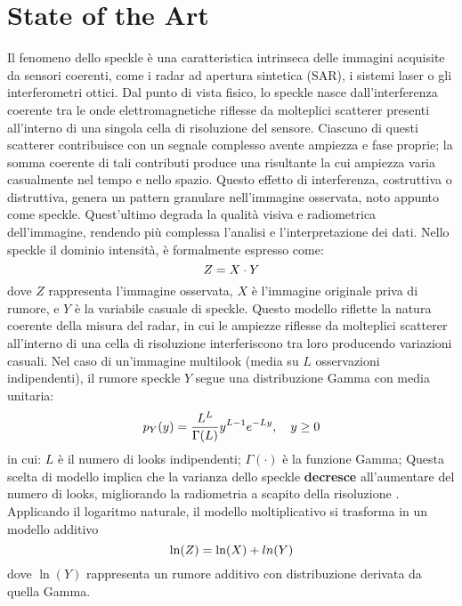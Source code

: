 
\chapter{State of the Art}
Il fenomeno dello speckle è una caratteristica intrinseca delle immagini acquisite da sensori coerenti, 
come i radar ad apertura sintetica (SAR), i sistemi laser o gli interferometri ottici. 
Dal punto di vista fisico, lo speckle nasce dall’interferenza coerente tra le onde elettromagnetiche riflesse 
da molteplici scatterer presenti all’interno di una singola cella di risoluzione del sensore. 
Ciascuno di questi scatterer contribuisce con un segnale complesso avente ampiezza e fase proprie; 
la somma coerente di tali contributi produce una risultante la cui ampiezza varia casualmente nel tempo e nello spazio.  
Questo effetto di interferenza, costruttiva o distruttiva, genera un pattern granulare nell’immagine osservata, 
noto appunto come speckle. Quest'ultimo degrada la qualità visiva e radiometrica dell’immagine, rendendo più complessa l’analisi e l’interpretazione dei dati.
Nello speckle il dominio intensità, è formalmente espresso come:
\[
    \makebox[\textwidth][c]{%
      $\displaystyle
      Z = X \cdot Y
      $%
    }
\]
dove $Z$ rappresenta l'immagine osservata, $X$ è l'immagine originale priva di rumore, 
e $Y$ è la variabile casuale di speckle. Questo modello riflette la natura coerente 
della misura del radar, in cui le ampiezze riflesse da molteplici scatterer all’interno di 
una cella di risoluzione interferiscono tra loro producendo variazioni casuali.
Nel caso di un'immagine multilook (media su $L$ osservazioni indipendenti), 
il rumore speckle $Y$ segue una distribuzione Gamma con media unitaria:
\begin{equation}
    \makebox[\textwidth][c]{%
      $\displaystyle
      p_Y(y) = \frac{L^L}{\Gamma(L)} y^{L-1} e^{-Ly}, \quad y \ge 0
      $%
    }
  \end{equation}
in cui: $L$ è il numero di looks indipendenti; $\Gamma(\cdot)$ è la funzione Gamma;
Questa scelta di modello implica che la varianza dello speckle \textbf{decresce} all'aumentare 
del numero di looks, migliorando la radiometria a scapito della risoluzione \cite{4767223}.
Applicando il logaritmo naturale, il modello moltiplicativo si trasforma 
in un modello additivo
\[
    \makebox[\textwidth][c]{%
      $\displaystyle
      \ln(Z) = \ln(X) + ln(Y)
      $%
    }
\]
dove $\ln(Y)$ rappresenta un rumore additivo con distribuzione derivata da quella Gamma. 
